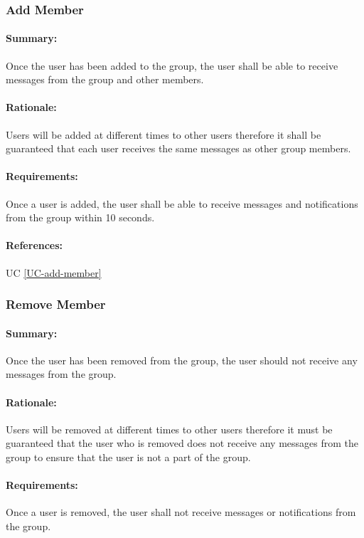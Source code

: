 \documentclass[11pt]{article}
\begin{document}
\subsubsection{Add Member} \label{FR-add-member}
\paragraph{Summary:}
Once the user has been added to the group, the user shall be able to receive messages from the group and other members.
\paragraph{Rationale:}
Users will be added at different times to other users therefore it shall be guaranteed that each user receives the same messages as other group members.
\paragraph{Requirements:}
Once a user is added, the user shall be able to receive messages and notifications from the group within 10 seconds.
\paragraph{References:} UC \ref{UC-add-member}

\subsubsection{Remove Member} \label{FR-remove-member}
\paragraph{Summary:}
Once the user has been removed from the group, the user should not receive any messages from the group.
\paragraph{Rationale:}
Users will be removed at different times to other users therefore it must be guaranteed that the user who is removed does not receive any messages from the group to ensure that the user is not a part of the group.
\paragraph{Requirements:}
Once a user is removed, the user shall not receive messages or notifications from the group.
\end{document}
